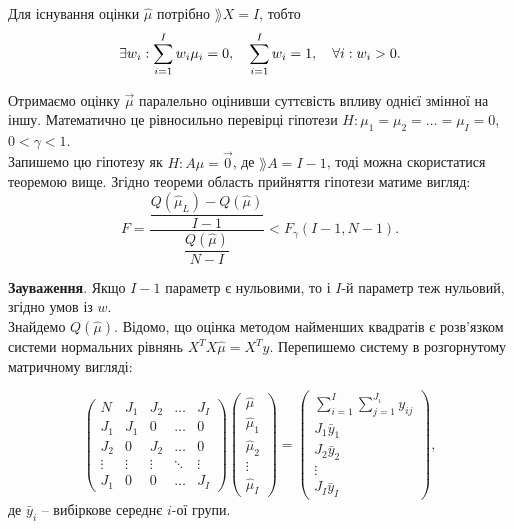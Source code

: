 
Для існування оцінки $\widehat{\mu}$ потрібно $\rang  X = I$, тобто \[ \exists w_i: \displaystyle\sum\limits_{i=1}^I w_i\mu_i=0, \quad \displaystyle\sum\limits_{i=1}^I w_i = 1, \quad \forall i: w_i > 0. \]

Отримаємо оцінку $\vec \mu$ паралельно оцінивши суттєвість впливу однієї змінної на іншу. Математично це рівносильно перевірці гіпотези $H: \mu_1 = \mu_2 = \ldots = \mu_I = 0$, $0<\gamma<1$. \\

Запишемо цю гіпотезу як $H: A \mu = \vec 0$, де $\rang  A = I -1$, тоді можна скористатися теоремою вище. Згідно теореми область прийняття гіпотези матиме вигляд: \[ F = \dfrac{\dfrac{Q(\widehat{\mu}_L)-Q(\widehat{\mu})}{I-1}}{\dfrac{Q(\widehat{\mu})}{N-I}} < F_\gamma(I-1,N-1). \]

\textbf{Зауваження}. Якщо $I-1$ параметр є нульовими, то і $I$-й параметр теж нульовий, згідно умов із $w$. \\

Знайдемо $Q(\widehat{\mu})$. Відомо, що оцінка методом найменших квадратів є розв'язком системи нормальних рівнянь $X^T X \widehat{\mu} = X^T y$. Перепишемо систему в розгорнутому матричному вигляді:

\[ \begin{pmatrix} N & J_1 & J_2 & \ldots & J_{I} \\ J_1 & J_1 & 0 & \ldots & 0 \\ J_2 & 0 & J_2 & \ldots & 0 \\ \vdots & \vdots & \vdots & \ddots & \vdots \\ J_1 & 0 & 0 & \ldots & J_I \end{pmatrix} \begin{pmatrix} \widehat{\mu} \\ \widehat{\mu}_1 \\ \widehat{\mu}_2 \\ \vdots \\ \widehat{\mu}_I \end{pmatrix} = \begin{pmatrix} \sum_{i=1}^I\sum_{j=1}^{J_i}y_{ij} \\ J_1 \bar{y}_1 \\ J_2 \bar{y}_2 \\ \vdots \\ J_I \bar{y}_I \end{pmatrix}, \] де $\bar{y}_i$ -- вибіркове середнє $i$-ої групи.\\

